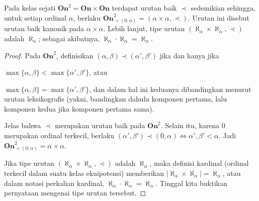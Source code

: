 \begin{theorem}\label{prop:Ord2-canonical}
	Pada kelas sejati $\textbf{On}^2 = \textbf{On} \times \textbf{On}$ terdapat urutan baik $\prec$ sedemikian sehingga, untuk setiap ordinal $\alpha$, berlaku $\textbf{On}^2_{\prec (0, \alpha)} = (\alpha \times \alpha, \prec)$. Urutan ini disebut urutan baik kanonik pada $\alpha \times \alpha$. Lebih lanjut, tipe urutan $(\aleph_\alpha \times \aleph_\alpha, \prec)$ adalah $\aleph_\alpha$; sebagai akibatnya, $\aleph_\alpha \cdot \aleph_\alpha = \aleph_\alpha$.
\end{theorem}
\begin{proof}
	Pada $\textbf{On}^2$, definisikan $(\alpha, \beta) \prec (\alpha', \beta')$ jika dan hanya jika
	\begin{compactitem}
		\item $\max\{\alpha, \beta\} < \max\{\alpha', \beta'\}$, atau
		\item $\max\{\alpha, \beta\} = \max\{\alpha', \beta'\}$, dan dalam hal ini keduanya dibandingkan menurut urutan leksikografis (yakni, bandingkan dahulu komponen pertama, lalu komponen kedua jika komponen pertama sama).
	\end{compactitem}
	Jelas bahwa $\prec$ merupakan urutan baik pada $\textbf{On}^2$. Selain itu, karena $0$ merupakan ordinal terkecil, berlaku $(\alpha', \beta') \prec (0, \alpha) \iff \alpha', \beta' < \alpha$. Jadi $\textbf{On}^2_{\prec (0, \alpha)} = \alpha \times \alpha$.
	
	Jika tipe urutan $(\aleph_\alpha \times \aleph_\alpha, \prec)$ adalah $\aleph_\alpha$, maka definisi kardinal (ordinal terkecil dalam suatu kelas ekuipotensi) memberikan $|\aleph_\alpha \times \aleph_\alpha| = \aleph_\alpha$, atau dalam notasi perkalian kardinal, $\aleph_\alpha \cdot \aleph_\alpha = \aleph_\alpha$. Tinggal kita buktikan pernyataan mengenai tipe urutan tersebut.


\end{proof}
